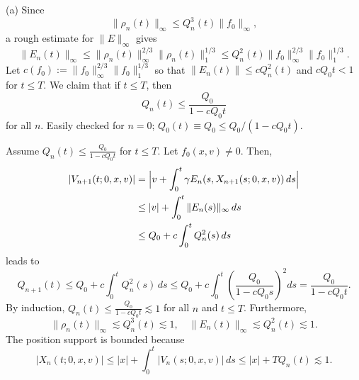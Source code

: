 \documentclass{article}
\begin{document}
\begin{pf}
(a)
Since
\[\|\rho_n(t)\|_\infty\le Q_n^3(t)\|f_0\|_\infty,\]
a rough estimate for $\|E\|_\infty$ gives
\[\|E_n(t)\|_\infty\le\|\rho_n(t)\|_\infty^{2/3}\|\rho_n(t)\|_1^{1/3}\le Q_n^2(t)\|f_0\|_\infty^{2/3}\|f_0\|_1^{1/3}.\]
Let $c(f_0):=\|f_0\|_\infty^{2/3}\|f_0\|_1^{1/3}$ so that $\|E_n(t)\|\le cQ_n^2(t)$ and $cQ_0t<1$ for $t\le T$.
We claim that if $t\le T$, then
\[Q_n(t)\le\frac{Q_0}{1-cQ_0t}\]
for all $n$.
Easily checked for $n=0$; $Q_0(t)\equiv Q_0\le Q_0/(1-cQ_0t)$.

Assume $Q_n(t)\le\frac{Q_0}{1-cQ_0t}$ for $t\le T$.
Let $f_0(x,v)\ne0$.
Then,
\begin{align*}
|V_{n+1}(t;0,x,v)|
&=\Bigl|v+\int_0^t\gamma E_n(s,X_{n+1}(s;0,x,v))\,ds\Bigr|\\
&\le|v|+\int_0^t\|E_n(s)\|_\infty\,ds\\
&\le Q_0+c\int_0^tQ_n^2(s)\,ds
\end{align*}
leads to
\[Q_{n+1}(t)\le Q_0+c\int_0^tQ_n^2(s)\,ds\le Q_0+c\int_0^t\left(\frac{Q_0}{1-cQ_0s}\right)^2ds=\frac{Q_0}{1-cQ_0t}.\]
By induction, $Q_n(t)\le\frac{Q_0}{1-cQ_0t}\lesssim1$ for all $n$ and $t\le T$.
Furthermore,
\[\|\rho_n(t)\|_\infty\lesssim Q_n^3(t)\lesssim1,\quad\|E_n(t)\|_\infty\lesssim Q_n^2(t)\lesssim1.\]
The position support is bounded because
\[|X_n(t;0,x,v)|\le|x|+\int_0^t|V_n(s;0,x,v)|\,ds\le|x|+TQ_n(t)\lesssim1.\]


\end{pf}
\end{document}
